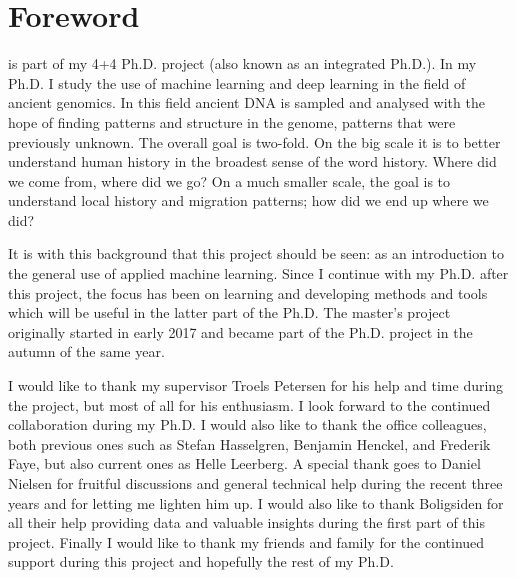 \chapter*{Foreword}

 is part of my 4+4 Ph.D. project (also known as an integrated Ph.D.). In my Ph.D. I study the use of machine learning and deep learning in the field of ancient genomics. In this field ancient DNA is sampled and analysed with the hope of finding patterns and structure in the genome, patterns that were previously unknown. The overall goal is two-fold. On the big scale it is to better understand human history in the broadest sense of the word history. Where did we come from, where did we go? On a much smaller scale, the goal is to understand local history and migration patterns; how did we end up where we did? 

It is with this background that this project should be seen: as an introduction to the general use of applied machine learning. Since I continue with my Ph.D. after this project, the focus has been on learning and developing methods and tools which will be useful in the latter part of the Ph.D. The master's project originally started in early \num{2017} and became part of the Ph.D. project in the autumn of the same year. 

I would like to thank my supervisor Troels Petersen for his help and time during the project, but most of all for his enthusiasm. I look forward to the continued collaboration during my Ph.D. I would also like to thank the office colleagues, both previous ones such as Stefan Hasselgren, Benjamin Henckel, and Frederik Faye, but also current ones as Helle Leerberg. A special thank goes to Daniel Nielsen for fruitful discussions and general technical help during the recent three years and for letting me lighten him up. I would also like to thank Boligsiden for all their help providing data and valuable insights during the first part of this project. Finally I would like to thank my friends and family for the continued support during this project and hopefully the rest of my Ph.D. 